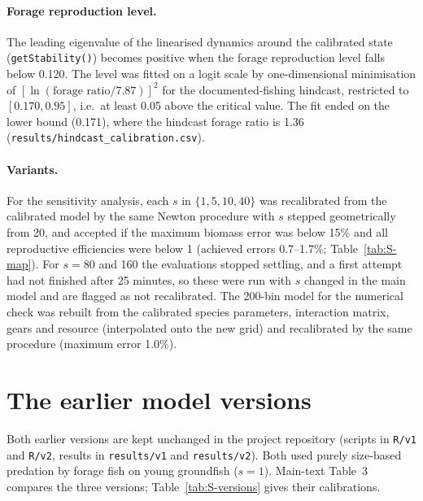 \documentclass[11pt,letterpaper,fleqn]{article}
\begin{document}
\paragraph{Forage reproduction level.} The leading eigenvalue of the linearised dynamics around the calibrated state (\texttt{getStability()}) becomes positive when the forage reproduction level falls below 0.120. The level was fitted on a logit scale by one-dimensional minimisation of $[\ln(\text{forage ratio}/7.87)]^{2}$ for the documented-fishing hindcast, restricted to $[0.170, 0.95]$, i.e.\ at least 0.05 above the critical value. The fit ended on the lower bound (0.171), where the hindcast forage ratio is 1.36 (\nolinkurl{results/hindcast_calibration.csv}).

\paragraph{Variants.} For the sensitivity analysis, each $s$ in $\{1, 5, 10, 40\}$ was recalibrated from the calibrated model by the same Newton procedure with $s$ stepped geometrically from 20, and accepted if the maximum biomass error was below 15\% and all reproductive efficiencies were below 1 (achieved errors 0.7--1.7\%; Table~\ref{tab:S-map}). For $s=80$ and 160 the evaluations stopped settling, and a first attempt had not finished after 25 minutes, so these were run with $s$ changed in the main model and are flagged as not recalibrated. The 200-bin model for the numerical check was rebuilt from the calibrated species parameters, interaction matrix, gears and resource (interpolated onto the new grid) and recalibrated by the same procedure (maximum error 1.0\%).

\section{The earlier model versions}\label{sec:S-versions}

Both earlier versions are kept unchanged in the project repository (scripts in \nolinkurl{R/v1} and \nolinkurl{R/v2}, results in \nolinkurl{results/v1} and \nolinkurl{results/v2}). Both used purely size-based predation by forage fish on young groundfish ($s=1$). Main-text Table~3 compares the three versions; Table~\ref{tab:S-versions} gives their calibrations.
\end{document}
